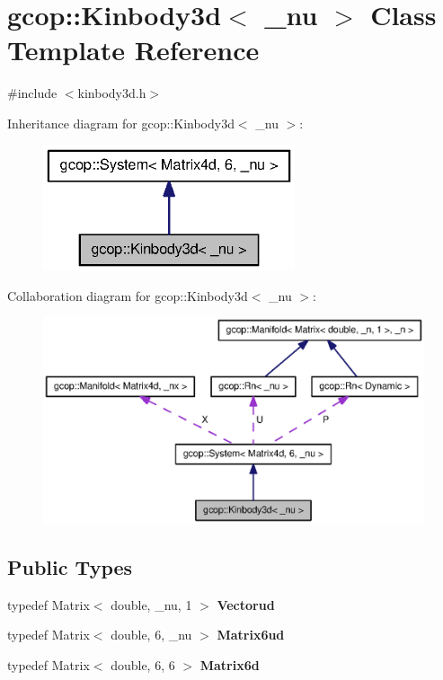 \section{gcop\-:\-:\-Kinbody3d$<$ \-\_\-nu $>$ \-Class \-Template \-Reference}
\label{classgcop_1_1Kinbody3d}


{\ttfamily \#include $<$kinbody3d.\-h$>$}



\-Inheritance diagram for gcop\-:\-:\-Kinbody3d$<$ \-\_\-nu $>$\-:
\nopagebreak
\begin{figure}[H]
\begin{center}
\leavevmode
\includegraphics[width=210pt]{classgcop_1_1Kinbody3d__inherit__graph}
\end{center}
\end{figure}


\-Collaboration diagram for gcop\-:\-:\-Kinbody3d$<$ \-\_\-nu $>$\-:
\nopagebreak
\begin{figure}[H]
\begin{center}
\leavevmode
\includegraphics[width=350pt]{classgcop_1_1Kinbody3d__coll__graph}
\end{center}
\end{figure}
\subsection*{\-Public \-Types}
\begin{DoxyCompactItemize}
\item 
typedef \-Matrix$<$ double, \-\_\-nu, 1 $>$ {\bf \-Vectorud}
\item 
typedef \-Matrix$<$ double, 6, \-\_\-nu $>$ {\bf \-Matrix6ud}
\item 
typedef \-Matrix$<$ double, 6, 6 $>$ {\bf \-Matrix6d}
\end{DoxyCompactItemize}
